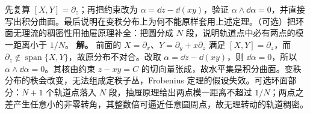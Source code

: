 \par
\begin{workedexample}
先复算 \([X,Y]=\partial_z\)；再把约束改为 \(\alpha=\dd z-\dd(xy)\)，验证 \(\alpha\wedge \dd\alpha=0\)，并直接写出积分曲面。最后说明在变秩分布上为何不能原样套用上述定理。（可选）把环面无理流的稠密性用抽屉原理补全：把圆分成 \(N\) 段，说明轨道点中必有两点的模一距离小于 \(1/N\)。
\textbf{解。} 前面的 \(X=\partial_x\)、\(Y=\partial_y+x\partial_z\) 满足 \([X,Y]=\partial_z\)，而 \(\partial_z\notin\operatorname{span}\{X,Y\}\)，故原分布不对合。改取 \(\alpha=\dd z-\dd(xy)\)，则 \(\dd\alpha=0\)，所以 \(\alpha\wedge\dd\alpha=0\)。其核由约束 \(z-xy=C\) 的切向量张成，故水平集是积分曲面。变秩分布的秩会改变，无法组成定秩子丛，Frobenius 定理的假设失效。可选环面部分：\(N+1\) 个轨道点落入 \(N\) 段，抽屉原理给出两点模一距离不超过 \(1/N\)；两点之差产生任意小的非零转角，其整数倍可逼近任意圆周点，故无理转动的轨道稠密。
\end{workedexample}
\par
